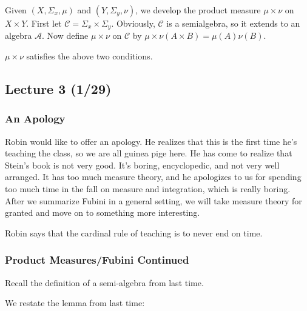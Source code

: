 \documentclass[10pt, twoside]{article}
\begin{document}
    Given $(X, \Sigma_x, \mu)$ and $(Y,\Sigma_y,\nu)$, we develop the product measure $\mu \times \nu$ on $X \times Y$. First let $\mathcal{C} = \Sigma_x \times \Sigma_y$. Obviously, $\mathcal{C}$ is a semialgebra, so it extends to an algebra $\mathcal{A}$. Now define $\mu \times \nu$ on $\mathcal{C}$ by $\mu \times \nu (A \times B) = \mu(A)\nu(B)$.

    \begin{lem}
        $\mu \times \nu$ satisfies the above two conditions.
    \end{lem}

    \subsection{Lecture 3 (1/29)}

    \subsubsection{An Apology}
    Robin would like to offer an apology. He realizes that this is the first time he's teaching the class, so we are all guinea pige here. He has come to realize that Stein's book is not very good. It's boring, encyclopedic, and not very well arranged. It has too much measure theory, and he apologizes to us for spending too much time in the fall on measure and integration, which is really boring. After we summarize Fubini in a general setting, we will take measure theory for granted and move on to something more interesting.

    Robin says that the cardinal rule of teaching is to never end on time.

    \subsubsection{Product Measures/Fubini Continued}
    Recall the definition of a semi-algebra from last time.

    We restate the lemma from last time: 
\end{document}
